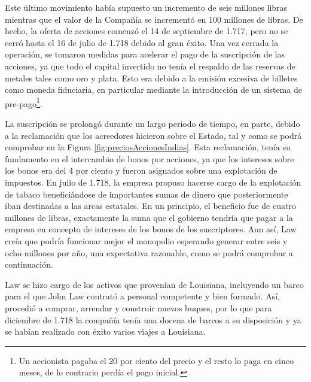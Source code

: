 Este último movimiento había supuesto un incremento de seis millones libras mientras que el valor de la Compañía se incrementó en 100 millones de libras. De hecho, la oferta de acciones comenzó el 14 de septiembre de 1.717, pero no se cerró hasta el 16 de julio de 1.718 debido al gran éxito. Una vez cerrada la operación, se tomaron medidas para acelerar el pago de la suscripción de las acciones, ya que todo el capital invertido no tenía el respaldo de las reservas de metales tales como oro y plata. Esto era debido a la emisión excesiva de billetes como moneda fiduciaria, en particular mediante la introducción de un sistema de pre-pago\footnote{Un accionista pagaba el 20 por ciento del precio y el resto lo paga en cinco meses, de lo contrario perdía el pago inicial.}. 

La suscripción se prolongó durante un largo periodo de tiempo, en parte, debido a la reclamación que los acreedores hicieron sobre el Estado, tal y como se podrá comprobar en la Figura \ref{fig:preciosAccionesIndias}. Esta reclamación, tenía su fundamento en el intercambio de bonos por acciones, ya que los intereses sobre los bonos era del 4 por ciento y fueron asignados sobre una explotación de impuestos. En julio de 1.718, la empresa propuso hacerse cargo de la explotación de tabaco beneficiándose de importantes sumas de dinero que posteriormente iban destinadas a las arcas estatales.
En un principio, el beneficio fue de cuatro millones de libras, exactamente la suma que el gobierno tendría que pagar a la empresa en concepto de intereses de los bonos de los suscriptores. Aun así, Law creía que podría funcionar mejor el monopolio esperando generar entre seis y ocho millones por año, una expectativa razonable, como se podrá comprobar a continuación.

Law se hizo cargo de los activos que provenían de Louisiana, incluyendo un barco para el que John Law contrató a personal competente y bien formado. Así, procedió a comprar, arrendar y construir nuevos buques, por lo que para diciembre de 1.718 la compañía tenía una docena de barcos a su disposición y ya se habían realizado con éxito varios viajes a Louisiana.

